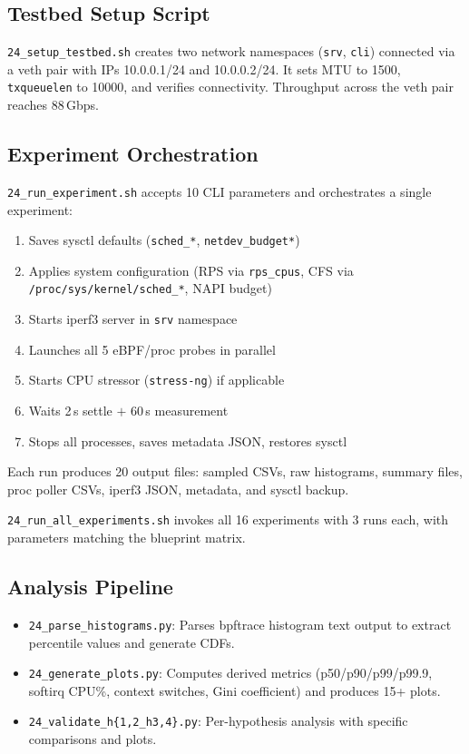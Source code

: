 \documentclass[11pt,a4paper]{article}
\begin{document}
\subsection{Testbed Setup Script}

\texttt{24\_setup\_testbed.sh} creates two network namespaces (\texttt{srv}, \texttt{cli}) connected via a veth pair with IPs 10.0.0.1/24 and 10.0.0.2/24. It sets MTU to 1500, \texttt{txqueuelen} to 10000, and verifies connectivity. Throughput across the veth pair reaches 88\,Gbps.

\subsection{Experiment Orchestration}

\texttt{24\_run\_experiment.sh} accepts 10 CLI parameters and orchestrates a single experiment:
\begin{enumerate}[leftmargin=*]
  \item Saves sysctl defaults (\texttt{sched\_*}, \texttt{netdev\_budget*})
  \item Applies system configuration (RPS via \texttt{rps\_cpus}, CFS via \texttt{/proc/sys/kernel/sched\_*}, NAPI budget)
  \item Starts iperf3 server in \texttt{srv} namespace
  \item Launches all 5 eBPF/proc probes in parallel
  \item Starts CPU stressor (\texttt{stress-ng}) if applicable
  \item Waits 2\,s settle $+$ 60\,s measurement
  \item Stops all processes, saves metadata JSON, restores sysctl
\end{enumerate}

Each run produces 20 output files: sampled CSVs, raw histograms, summary files, proc poller CSVs, iperf3 JSON, metadata, and sysctl backup.

\texttt{24\_run\_all\_experiments.sh} invokes all 16 experiments with 3 runs each, with parameters matching the blueprint matrix.

\subsection{Analysis Pipeline}

\begin{itemize}[leftmargin=*]
  \item \texttt{24\_parse\_histograms.py}: Parses bpftrace histogram text output to extract percentile values and generate CDFs.
  \item \texttt{24\_generate\_plots.py}: Computes derived metrics (p50/p90/p99/p99.9, softirq CPU\%, context switches, Gini coefficient) and produces 15+ plots.
  \item \texttt{24\_validate\_h\{1,2\_h3,4\}.py}: Per-hypothesis analysis with specific comparisons and plots.
\end{itemize}
\end{document}
